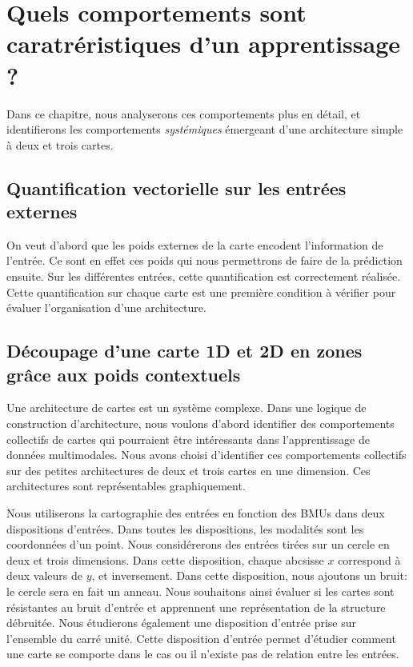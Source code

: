 \documentclass[../main]{subfiles}
\begin{document}
\section{Quels comportements sont caratréristiques d'un apprentissage ?}
Dans ce chapitre, nous analyserons ces comportements plus en détail, et identifierons les comportements \emph{systémiques} émergeant d'une architecture simple à deux et trois cartes.

\subsection{Quantification vectorielle sur les entrées externes}

On veut d'abord que les poids externes de la carte encodent l'information de l'entrée. Ce sont en effet ces poids qui nous permettrons de faire de la prédiction ensuite.
Sur les différentes entrées, cette quantification est correctement réalisée. 
Cette quantification sur chaque carte est une première condition à vérifier pour évaluer l'organisation d'une architecture.

\subsection{Découpage d'une carte 1D et 2D en zones grâce aux poids contextuels}

Une architecture de cartes est un système complexe. 
Dans une logique de construction d'architecture, nous voulons d'abord identifier des comportements collectifs de cartes qui pourraient être intéressants dans l'apprentissage de données multimodales.
Nous avons choisi d'identifier ces comportements collectifs sur des petites architectures de deux et trois cartes en une dimension. Ces architectures sont représentables graphiquement.

Nous utiliserons la cartographie des entrées en fonction des BMUs dans deux dispositions d'entrées.
Dans toutes les dispositions, les modalités sont les coordonnées d'un point.
Nous considérerons des entrées tirées sur un cercle en deux et trois dimensions.
Dans cette disposition, chaque abcsisse $x$ correspond à deux valeurs de $y$, et inversement.
Dans cette disposition, nous ajoutons un bruit: le cercle sera en fait un anneau. Nous souhaitons ainsi évaluer si les cartes sont résistantes au bruit d'entrée et apprennent une représentation de la structure débruitée.
Nous étudierons également une disposition d'entrée prise sur l'ensemble du carré unité. Cette disposition d'entrée permet d'étudier comment une carte se comporte dans le cas ou il n'existe pas de relation entre les entrées.
\end{document}
